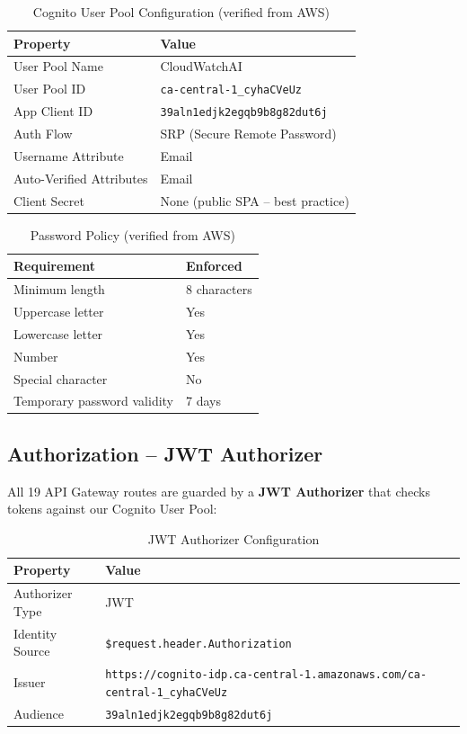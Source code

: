 \documentclass[11pt,a4paper]{article}
\begin{document}
\begin{table}[H]
\centering
\begin{tabular}{ll}
\toprule
\textbf{Property} & \textbf{Value} \\
\midrule
User Pool Name & CloudWatchAI \\
User Pool ID & \texttt{ca-central-1\_cyhaCVeUz} \\
App Client ID & \texttt{39aln1edjk2egqb9b8g82dut6j} \\
Auth Flow & SRP (Secure Remote Password) \\
Username Attribute & Email \\
Auto-Verified Attributes & Email \\
Client Secret & None (public SPA -- best practice) \\
\bottomrule
\end{tabular}
\caption{Cognito User Pool Configuration (verified from AWS)}
\label{tab:cognito-config}
\end{table}

\begin{table}[H]
\centering
\begin{tabular}{ll}
\toprule
\textbf{Requirement} & \textbf{Enforced} \\
\midrule
Minimum length & 8 characters \\
Uppercase letter & Yes \\
Lowercase letter & Yes \\
Number & Yes \\
Special character & No \\
Temporary password validity & 7 days \\
\bottomrule
\end{tabular}
\caption{Password Policy (verified from AWS)}
\label{tab:password-policy}
\end{table}

\subsection{Authorization -- JWT Authorizer}

All 19 API Gateway routes are guarded by a \textbf{JWT Authorizer} that checks tokens against our Cognito User Pool:

\begin{table}[H]
\centering
\begin{tabular}{ll}
\toprule
\textbf{Property} & \textbf{Value} \\
\midrule
Authorizer Type & JWT \\
Identity Source & \texttt{\$request.header.Authorization} \\
Issuer & \texttt{https://cognito-idp.ca-central-1.amazonaws.com/ca-central-1\_cyhaCVeUz} \\
Audience & \texttt{39aln1edjk2egqb9b8g82dut6j} \\
\bottomrule
\end{tabular}
\caption{JWT Authorizer Configuration}
\label{tab:jwt-auth}
\end{table}
\end{document}
